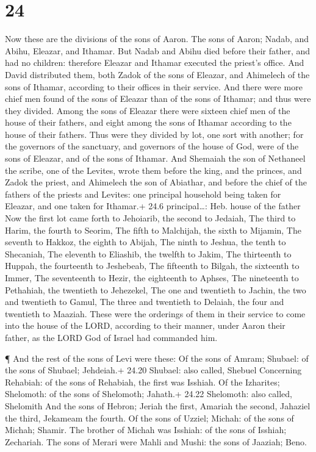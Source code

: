 \hypertarget{section-23}{%
\section{24}\label{section-23}}

 Now these are the divisions of the sons of Aaron. The sons
of Aaron; Nadab, and Abihu, Eleazar, and Ithamar.  But Nadab
and Abihu died before their father, and had no children: therefore
Eleazar and Ithamar executed the priest's office.  And David
distributed them, both Zadok of the sons of Eleazar, and Ahimelech of
the sons of Ithamar, according to their offices in their service.
 And there were more chief men found of the sons of Eleazar
than of the sons of Ithamar; and thus were they divided. Among the sons
of Eleazar there were sixteen chief men of the house of their fathers,
and eight among the sons of Ithamar according to the house of their
fathers.  Thus were they divided by lot, one sort with
another; for the governors of the sanctuary, and governors of the house
of God, were of the sons of Eleazar, and of the sons of Ithamar.
 And Shemaiah the son of Nethaneel the scribe, one of the
Levites, wrote them before the king, and the princes, and Zadok the
priest, and Ahimelech the son of Abiathar, and before the chief of the
fathers of the priests and Levites: one principal household being taken
for Eleazar, and one taken for Ithamar.+ 24.6 principal\ldots: Heb.
house of the father  Now the first lot came forth to
Jehoiarib, the second to Jedaiah,  The third to Harim, the
fourth to Seorim,  The fifth to Malchijah, the sixth to
Mijamin,  The seventh to Hakkoz, the eighth to Abijah,
 The ninth to Jeshua, the tenth to Shecaniah, 
The eleventh to Eliashib, the twelfth to Jakim,  The
thirteenth to Huppah, the fourteenth to Jeshebeab,  The
fifteenth to Bilgah, the sixteenth to Immer,  The
seventeenth to Hezir, the eighteenth to Aphses,  The
nineteenth to Pethahiah, the twentieth to Jehezekel,  The
one and twentieth to Jachin, the two and twentieth to Gamul,
 The three and twentieth to Delaiah, the four and twentieth
to Maaziah.  These were the orderings of them in their
service to come into the house of the LORD, according to their manner,
under Aaron their father, as the LORD God of Israel had commanded him.

 ¶ And the rest of the sons of Levi were these: Of the sons
of Amram; Shubael: of the sons of Shubael; Jehdeiah.+ 24.20 Shubael:
also called, Shebuel  Concerning Rehabiah: of the sons of
Rehabiah, the first was Isshiah.  Of the Izharites;
Shelomoth: of the sons of Shelomoth; Jahath.+ 24.22 Shelomoth: also
called, Shelomith  And the sons of Hebron; Jeriah the
first, Amariah the second, Jahaziel the third, Jekameam the fourth.
 Of the sons of Uzziel; Michah: of the sons of Michah;
Shamir.  The brother of Michah was Isshiah: of the sons of
Isshiah; Zechariah.  The sons of Merari were Mahli and
Mushi: the sons of Jaaziah; Beno.

